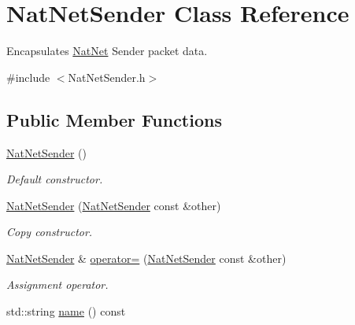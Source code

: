 \hypertarget{classNatNetSender}{\section{\-Nat\-Net\-Sender \-Class \-Reference}
\label{classNatNetSender}
}


\-Encapsulates \hyperlink{classNatNet}{\-Nat\-Net} \-Sender packet data.  




{\ttfamily \#include $<$\-Nat\-Net\-Sender.\-h$>$}

\subsection*{\-Public \-Member \-Functions}
\begin{DoxyCompactItemize}
\item 
\hypertarget{classNatNetSender_aa3801cb63269a920edc55a6e78fec4e6}{\hyperlink{classNatNetSender_aa3801cb63269a920edc55a6e78fec4e6}{\-Nat\-Net\-Sender} ()}\label{classNatNetSender_aa3801cb63269a920edc55a6e78fec4e6}

\begin{DoxyCompactList}\small\item\em \-Default constructor. \end{DoxyCompactList}\item 
\hypertarget{classNatNetSender_ad28a14e9e6696252263655e0325a2199}{\hyperlink{classNatNetSender_ad28a14e9e6696252263655e0325a2199}{\-Nat\-Net\-Sender} (\hyperlink{classNatNetSender}{\-Nat\-Net\-Sender} const \&other)}\label{classNatNetSender_ad28a14e9e6696252263655e0325a2199}

\begin{DoxyCompactList}\small\item\em \-Copy constructor. \end{DoxyCompactList}\item 
\hypertarget{classNatNetSender_aae7d9a850d0c33056e3584d89779e19a}{\hyperlink{classNatNetSender}{\-Nat\-Net\-Sender} \& \hyperlink{classNatNetSender_aae7d9a850d0c33056e3584d89779e19a}{operator=} (\hyperlink{classNatNetSender}{\-Nat\-Net\-Sender} const \&other)}\label{classNatNetSender_aae7d9a850d0c33056e3584d89779e19a}

\begin{DoxyCompactList}\small\item\em \-Assignment operator. \end{DoxyCompactList}\item 
\hypertarget{classNatNetSender_a8c2d5cf1a46cfbb1fadc347dedad6f14}{std\-::string \hyperlink{classNatNetSender_a8c2d5cf1a46cfbb1fadc347dedad6f14}{name} () const }\label{classNatNetSender_a8c2d5cf1a46cfbb1fadc347dedad6f14}


\end{DoxyCompactItemize}
